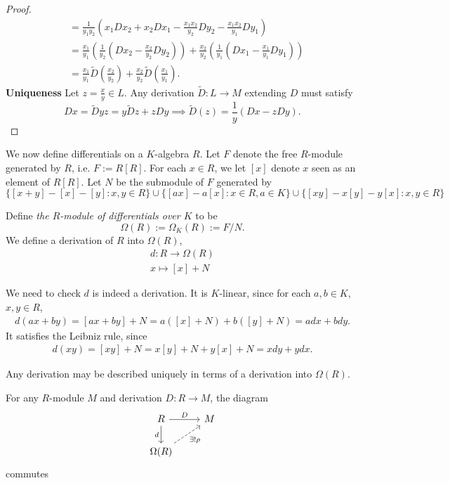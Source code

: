 \begin{proof}
\begin{align*}
        &= \frac{1}{y_1y_2}\left(x_1Dx_2 + x_2Dx_1- \frac{x_1x_2}{y_2}Dy_2-\frac{x_1x_2}{y_1}Dy_1\right)\\
        &= \frac{x_1}{y_1}\left(\frac{1}{y_2}\left(Dx_2-\frac{x_2}{y_2}Dy_2 \right)\right)+\frac{x_2}{y_2}\left(\frac{1}{y_1}\left(Dx_1-\frac{x_1}{y_1}Dy_1\right) \right)\\
        &= \frac{x_1}{y_1}\widetilde{D}\left(\frac{x_2}{y_2}\right)+\frac{x_2}{y_2}\widetilde{D}\left(\frac{x_1}{y_1}\right).
    \end{align*}
    \textbf{Uniqueness} Let $z = \frac{x}{y}\in L$. Any derivation $\widetilde{D} : L\rightarrow M$ extending $D$ must satisfy 
    $$
        Dx = \widetilde{D}yz = y\widetilde{D}z + zDy \implies \widetilde{D}(z) = \frac{1}{y}(Dx-zDy). 
    $$
\end{proof}
We now define differentials on a $K$-algebra $R$. Let $F$ denote the free $R$-module generated by $R$, i.e. $F:= R[R]$. For each $x\in R$, we let $[x]$ denote $x$ seen as an element of $R[R]$. Let $N$ be the submodule of $F$ generated by 
$$
    \{[x+y]-[x]-[y] : x,y\in R\}\cup \{[ax]-a[x] : x\in R, a\in K\}\cup \{[xy]-x[y]-y[x] : x,y\in R\}
$$
\begin{definition}
    Define \emph{the $R$-module of differentials over $K$} to be 
    $$
        \Omega(R) := \Omega_K(R):= F/N.
    $$
    We define a derivation of $R$ into $\Omega(R)$, 
    \begin{gather*}
        d : R\rightarrow \Omega(R)\\
        x \mapsto [x]+N
    \end{gather*} 
\end{definition}
\begin{remark}
    \begin{enumerate}
        We need to check $d$ is indeed a derivation. It is $K$-linear, since for each $a,b\in K$, $x,y\in R$, 
        \begin{align*}
            d(ax+by) = [ax+by]+N=a([x]+N)+b([y]+N)= adx+bdy. 
        \end{align*}
        It satisfies the Leibniz rule, since
        \begin{align*}
            d(xy)=[xy]+N = x[y]+N + y[x]+N=xdy+ydx.
        \end{align*}
    \end{enumerate}
\end{remark}
Any derivation may be described uniquely in terms of a derivation into $\Omega(R)$. 
\begin{lemma}\label{ExtensionOfDerivationToFieldOfFractions}
    For any $R$-module $M$ and derivation $D: R\rightarrow M$, the diagram 
    $$
        \begin{tikzcd}
            R\arrow[d,"d"']\arrow[r,"D"] & M\\
            \Omega(R) \arrow[ur,dashrightarrow,"\exists!\rho"']
        \end{tikzcd}
    $$
    commutes
\end{lemma}
